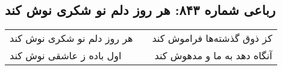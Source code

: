 \begin{center}
\section*{رباعی شماره ۸۴۳: هر روز دلم نو شکری نوش کند}
\label{sec:0843}
\begin{longtable}{l p{0.5cm} r}
هر روز دلم نو شکری نوش کند
&&
کز ذوق گذشته‌ها فراموش کند
\\
اول باده ز عاشقی نوش کند
&&
آنگاه دهد به ما و مدهوش کند
\\
\end{longtable}
\end{center}
